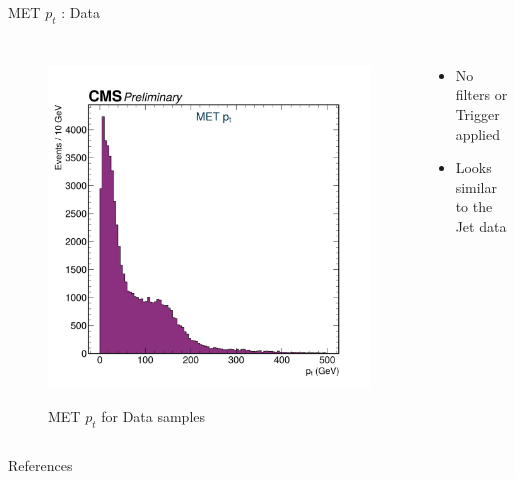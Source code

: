 \documentclass[10pt,xcolor=dvipsnames]{beamer}
\begin{document}
    
   \begin{frame}[fragile]{MET $p_t$ : Data} 
    \begin{columns}
    \begin{figure} 
    \centering 
     \includegraphics[width=1\textwidth]{../Archive/KinemPlots/METData.png }
    \label{METMC} 
    \caption{MET $p_t$ for Data samples}
    \end{figure} 
    \begin{itemize} 
    \raggedright 
    \small
    \item No filters or Trigger applied
    \item Looks similar to the Jet data
    \end{itemize}
    \end{columns} 
    \end{frame} 

\appendix



\begin{frame}[allowframebreaks]{References}

  
  

\end{frame}
\end{document}
